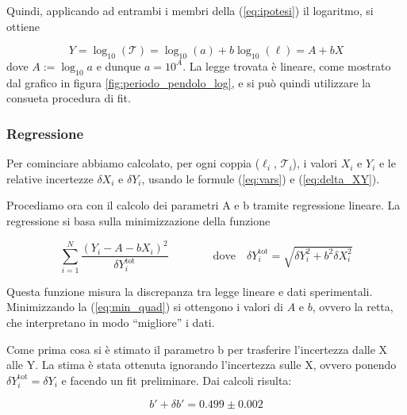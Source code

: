Quindi, applicando ad entrambi i membri della (\ref{eq:ipotesi}) il logaritmo, si ottiene

\begin{equation}
    Y = \log_{10} (\mathcal{T}) = \log_{10} (a) + b \log_{10} (\ell) = A + b X
\end{equation}
%
dove $A := \log_{10} a$ e dunque $a = 10^A$. La legge trovata è lineare, come mostrato dal grafico
in figura \ref{fig:periodo_pendolo_log}, e si può quindi utilizzare la consueta procedura di fit.


\subsubsection{Regressione}
\label{l_regressione}

Per cominciare abbiamo calcolato, per ogni coppia ($\ell_i$, $\mathcal{T}_i$), i valori $X_i$ e $Y_i$
e le relative incertezze $\delta X_i$ e $\delta Y_i$, usando le formule (\ref{eq:vars}) e (\ref{eq:delta_XY}).

Procediamo ora con il calcolo dei parametri A e b tramite regressione lineare. 
La regressione si basa sulla minimizzazione della funzione

\begin{equation}
    \sum_{i=1}^N \frac{(Y_i - A - bX_i)^2}{\delta Y_i^{\text{tot}}}
    \qquad \qquad \text{dove} \quad
    \delta Y_i^{\text{tot}} = \sqrt{\delta Y_i^2 + b^2 \delta X_i^2}
    \label{eq:min_quad}
\end{equation}

Questa funzione misura la discrepanza tra legge lineare e dati sperimentali. Minimizzando la (\ref{eq:min_quad}) si ottengono
i valori di $A$ e $b$, ovvero la retta, che interpretano in modo ``migliore'' i dati.

Come prima cosa si è stimato il parametro b per trasferire l'incertezza dalle X alle Y.
La stima è stata ottenuta ignorando l'incertezza sulle X, ovvero ponendo $\delta Y_i^{\text{tot}} = \delta Y_i$ e facendo un fit preliminare.
Dai calcoli risulta:

\begin{equation}
    b' + \delta b' = 0.499 \pm 0.002
\end{equation}

